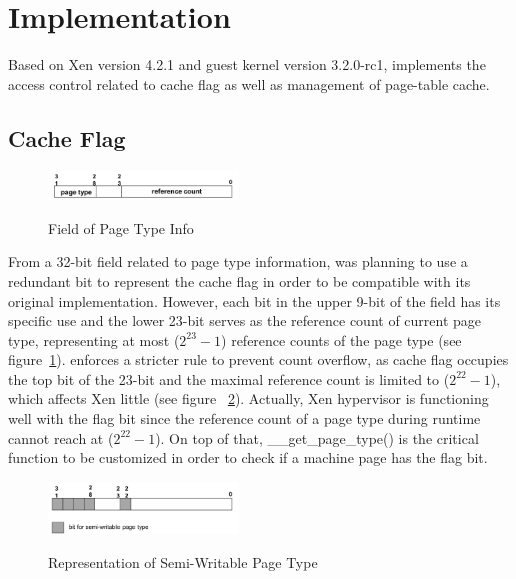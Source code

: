 \section{Implementation} \label{sec:impl}

Based on Xen version 4.2.1 and guest kernel version 3.2.0-rc1, \name implements the access control related to cache flag as well as management of page-table cache.

\subsection{Cache Flag}

\begin{figure}[ht]
\centering
\includegraphics[width=0.45\textwidth]{image/implementation/field-of-page-type-info.png} \\
\caption{Field of Page Type Info}
\label{fig:field-of-page-type-info}
\end{figure}

From a 32-bit field related to page type information, \name was planning to use a redundant bit to represent the cache flag in order to be compatible with its original implementation. However, each bit in the upper 9-bit of the field has its specific use and the lower 23-bit serves as the reference count of current page type, representing at most ($2^{23}-1$) reference counts of the page type (see figure~\ref{fig:field-of-page-type-info}). \name enforces a stricter rule to prevent count overflow, as cache flag occupies the top bit of the 23-bit and the maximal reference count is limited to ($2^{22}-1$), which affects Xen little (see figure ~\ref{fig:field-of-semi-type}). Actually, Xen hypervisor is functioning well with the flag bit since the reference count of a page type during runtime cannot reach at ($2^{22}-1$). On top of that, \_\_get\_page\_type() is the critical function to be customized in order to check if a machine page has the flag bit.

\begin{figure}[ht]
\centering
\includegraphics[width=0.45\textwidth]{image/implementation/field-of-semi-type.png} \\
\caption{Representation of Semi-Writable Page Type}
\label{fig:field-of-semi-type}
\end{figure}

